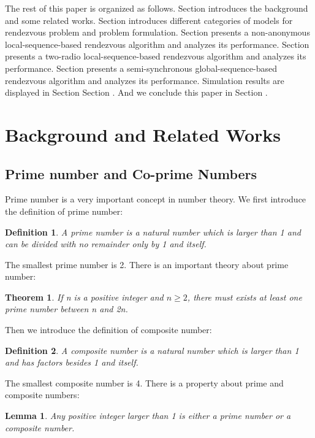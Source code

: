 \documentclass[10pt, conference, letterpaper]{IEEEtran}
\newtheorem{theorem}{Theorem}
\newtheorem{lemma}{Lemma}[section]
\newtheorem{definition}{Definition}[section]
\begin{document}
The rest of this paper is organized as follows. Section \uppercase\expandafter{} introduces the background and some related works. Section \uppercase\expandafter{} introduces different categories of models for rendezvous problem and problem formulation. Section \uppercase\expandafter{} presents a non-anonymous local-sequence-based rendezvous algorithm and analyzes its performance. Section \uppercase\expandafter{} presents a two-radio local-sequence-based rendezvous algorithm and analyzes its performance. Section \uppercase\expandafter{} presents a semi-synchronous global-sequence-based rendezvous algorithm and analyzes its performance. Simulation results are displayed in Section Section \uppercase\expandafter{}. And we conclude this paper in Section \uppercase\expandafter{}.




\section{Background and Related Works}


\subsection{Prime number and Co-prime Numbers}
Prime number is a very important concept in number theory. We first introduce the definition of prime number:
\begin{definition}
A prime number is a natural number which is larger than 1 and can be divided with no remainder only by 1 and itself.
\end{definition}

The smallest prime number is 2. There is an important theory about prime number:
\begin{theorem}
If n is a positive integer and $n \ge 2$, there must exists at least one prime number between n and 2n.
\end{theorem}

Then we introduce the definition of composite number:
\begin{definition}
A composite number is a natural number which is larger than 1 and has factors besides 1 and itself.
\end{definition}

The smallest composite number is 4. There is a property about prime and composite numbers:

\begin{lemma}
Any positive integer larger than 1 is either a prime number or a composite number.
\end{lemma}
\end{document}
